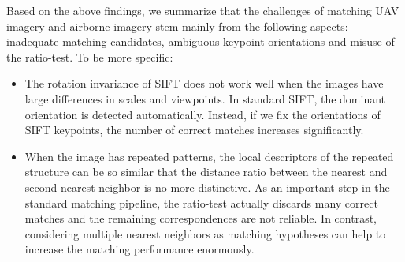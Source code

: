 

Based on the above findings, we summarize that the challenges of matching UAV imagery and airborne imagery stem mainly from the following aspects: inadequate matching candidates, ambiguous keypoint orientations and misuse of the ratio-test. To be more specific:

\begin{itemize}
\itemsep=0.03cm
\item The rotation invariance of SIFT does not work well when the images have large differences in scales and viewpoints. In standard SIFT, the dominant orientation is detected automatically. Instead, if we fix the orientations of SIFT keypoints, the number of correct matches increases significantly.
\item When the image has repeated patterns, the local descriptors of the repeated structure can be so similar that the distance ratio between the nearest and second nearest neighbor is no more distinctive. As an important step in the standard matching pipeline, the ratio-test actually discards many correct matches and the remaining correspondences are not reliable. In contrast, considering multiple nearest neighbors as matching hypotheses can help to increase the matching performance enormously.
\end{itemize}

